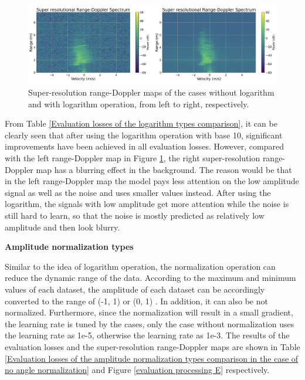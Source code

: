 \begin{figure}
    \centering
    \includegraphics[scale=.45]{figures/evaluation_processing_D.png}
    \caption{Super-resolution range-Doppler maps of the cases without logarithm and with logarithm operation, from left to right, respectively.}
    \label{super-resolution images of the logarithm types}
\end{figure}

From Table \ref{Evaluation losses of the logarithm types comparison}, it can be clearly seen that after using the logarithm operation with base 10, significant improvements have been achieved in all evaluation losses. However, compared with the left range-Doppler map in Figure \ref{super-resolution images of the logarithm types}, the right super-resolution range-Doppler map has a blurring effect in the background. The reason would be that in the left range-Doppler map the model pays less attention on the low amplitude signal as well as the noise and uses smaller values instead. After using the logarithm, the signals with low amplitude get more attention while the noise is still hard to learn, so that the noise is mostly predicted as relatively low amplitude and then look blurry.

\begin{spacing}{1.5}
\textbf{\large{Amplitude normalization types}}
\end{spacing}
Similar to the idea of logarithm operation, the normalization operation can reduce the dynamic range of the data. According to the maximum and minimum values of each dataset, the amplitude of each dataset can be accordingly converted to the range of (-1, 1) or (0, 1) . In addition, it can also be not normalized. Furthermore, since the normalization will result in a small gradient, the learning rate is tuned by the cases, only the case without normalization uses the learning rate as 1e-5, otherwise the learning rate as 1e-3. The results of the evaluation losses and the super-resolution range-Doppler maps are shown in Table \ref{Evaluation losses of the amplitude normalization types comparison in the case of no angle normalization} and Figure \ref{evaluation processing E} respectively.

